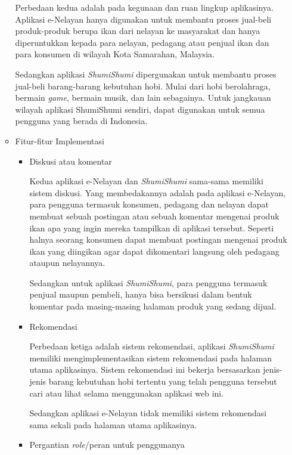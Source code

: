 \documentclass[a4paper]{article}
\begin{document}
\begin{enumerate}
\begin{itemize}
        Perbedaan kedua adalah pada kegunaan dan ruan lingkup aplikasinya. Aplikasi e-Nelayan hanya digunakan untuk membantu proses jual-beli produk-produk berupa ikan dari nelayan ke masyarakat dan hanya diperuntukkan kepada para nelayan, pedagang atau penjual ikan dan para konsumen di wilayah Kota Samarahan, Malaysia\autocite[1-10]{fishes-marketplace}.

        Sedangkan aplikasi \textit{ShumiShumi} dipergunakan untuk membantu proses jual-beli barang-barang kebutuhan hobi. Mulai dari hobi berolahraga, bermain \textit{game}, bermain musik, dan lain sebagainya. Untuk jangkauan wilayah aplikasi ShumiShumi sendiri, dapat digunakan untuk semua pengguna yang berada di Indonesia.

        \item Fitur-fitur Implementasi

        \begin{itemize}
            \item Diskusi atau komentar

            Kedua aplikasi e-Nelayan dan \textit{ShumiShumi} sama-sama memiliki sistem diskusi. Yang membedakannya adalah pada aplikasi e-Nelayan, para pengguna termasuk konsumen, pedagang dan nelayan dapat membuat sebuah postingan atau sebuah komentar mengenai produk ikan apa yang ingin mereka tampilkan di aplikasi tersebut. Seperti halnya seorang konsumen dapat membuat postingan mengenai produk ikan yang diingikan agar dapat dikomentari langsung oleh pedagang ataupun nelayannya\autocite[1-10]{fishes-marketplace}.

            Sedangkan untuk aplikasi \textit{ShumiShumi}, para pengguna termasuk penjual maupun pembeli, hanya bisa bersikusi dalam bentuk komentar pada masing-masing halaman produk yang sedang dijual.

            \item Rekomendasi

            Perbedaan ketiga adalah sistem rekomendasi, aplikasi \textit{ShumiShumi} memiliki mengimplementasikan sistem rekomendasi pada halaman utama aplikasinya. Sistem rekomendasi ini bekerja bersasarkan jenis-jenis barang kebutuhan hobi tertentu yang telah pengguna tersebut cari atau lihat selama menggunakan aplikasi web ini.

            Sedangkan aplikasi e-Nelayan tidak memiliki sistem rekomendasi sama sekali pada halaman utama aplikasinya\autocite[1-10]{fishes-marketplace}.

            \item Pergantian \textit{role}/peran untuk penggunanya


\end{itemize}
\end{itemize}
\end{enumerate}
\end{document}
